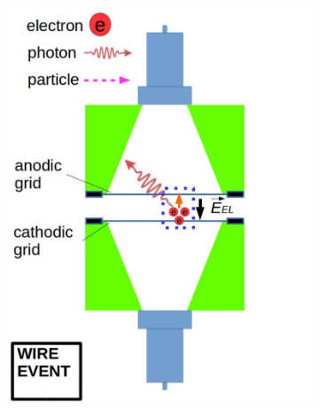 \begin{figure}[!htbp]
	\centering
	\begin{subfigure}[b]{\figurewidth}
		\centering
		\includegraphics[width=\halfwidth,clip,trim={0 0 0 0},angle=0,origin=c]{Figures/GasTest/WeiDrawEvent/WirePhotoF.jpg}

\end{subfigure}
\end{figure}
